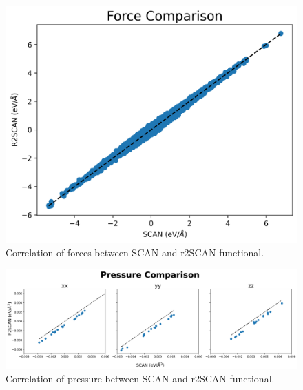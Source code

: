 \begin{figure}[h!]
  \centering
   \includegraphics[width=0.5\linewidth]{images/scan_vs_r2scan/force_compare.png}
  \caption{Correlation of forces between SCAN and r2SCAN functional. }
\end{figure}

\begin{figure}[h!]
  \centering
   \includegraphics[width=0.8\linewidth]{images/scan_vs_r2scan/pressure_compare.png}
  \caption{Correlation of pressure between SCAN and r2SCAN functional. }
\end{figure}

